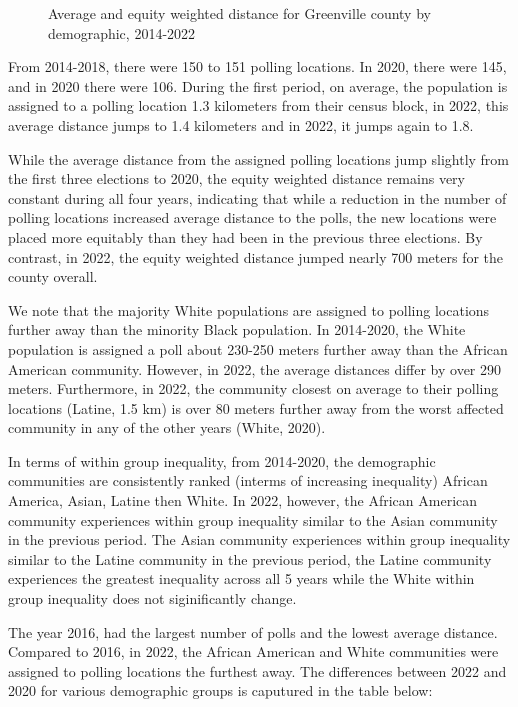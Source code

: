 \documentclass[11pt]{article}
\theoremstyle{remark}
\theoremstyle{definition}
\begin{document}
\begin{figure}
\begin{subfigure}{.8\textwidth}
		\label{sfig:Greenville equity dist}
	\end{subfigure}
	\caption{Average and equity weighted distance for Greenville county by demographic, 2014-2022}
	\label{fig:Greenville distance graphs}
\end{figure}


From 2014-2018, there were 150 to 151 polling locations. In 2020, there were 145, and in 2020 there were 106. During the first period, on average, the population is assigned to a polling location 1.3 kilometers from their census block, in 2022, this average distance jumps to 1.4 kilometers and in 2022, it jumps again to 1.8.

While the average distance from the assigned polling locations jump slightly from the first three elections to 2020, the equity weighted distance remains very constant during all four years, indicating that while a reduction in the number of polling locations increased average distance to the polls, the new locations were placed more equitably than they had been in the previous three elections. By contrast, in 2022, the equity weighted distance jumped nearly 700 meters for the county overall. 

We note that the majority White populations are assigned to polling locations further away than the minority Black population. In 2014-2020, the White population is assigned a poll about 230-250 meters further away than the African American community. However, in 2022, the average distances differ by over 290 meters. Furthermore, in 2022, the community closest on average to their polling locations (Latine, 1.5 km) is over 80 meters further away from the worst affected community in any of the other years (White, 2020).

In terms of within group inequality, from 2014-2020, the demographic communities are consistently ranked (interms of increasing inequality) African America, Asian, Latine then White. In 2022, however, the African American community experiences within group inequality similar to the Asian community in the previous period. The Asian community experiences within group inequality similar to the Latine community in the previous period, the Latine community experiences the greatest inequality across all 5 years while the White within group inequality does not siginificantly change. 

The year 2016, had the largest number of polls and the lowest average distance. Compared to 2016, in 2022, the African American and White communities were assigned to polling locations the furthest away. The differences between 2022 and 2020 for various demographic groups is caputured in the table below:
\end{document}
